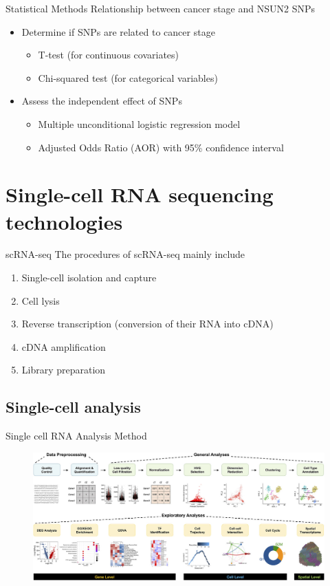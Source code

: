 \documentclass[12pt, aspectratio=43]{beamer}
\begin{document}
\begin{frame}{Statistical Methods}
	Relationship between cancer stage and NSUN2 SNPs
	
	\begin{itemize}
		\item Determine if SNPs are related to cancer stage
		\begin{itemize}
			\item T-test (for continuous covariates)
			\item Chi-squared test (for categorical variables)
		\end{itemize}
		
		\item Assess the independent effect of SNPs
		\begin{itemize}
			\item Multiple unconditional logistic regression model
			\item Adjusted Odds Ratio (AOR) with 95\% confidence interval
		\end{itemize}
	\end{itemize}
\end{frame}



\section{Single-cell RNA sequencing technologies}
\begin{frame}{scRNA-seq}
	The procedures of scRNA-seq mainly include \cite{jovic2022single} 
	\begin{enumerate}
		\item Single-cell isolation and capture
		\item Cell lysis
		\item Reverse transcription (conversion of their RNA into cDNA)
		\item cDNA amplification
		\item Library preparation
	\end{enumerate}
\end{frame}

\subsection{Single-cell analysis}
\begin{frame}{Single cell RNA Analysis Method}
	\begin{figure}[h!]
		\centering
		\includegraphics[width=\linewidth]{Figure/analysis.png}
	\end{figure}
\end{frame}
\end{document}
